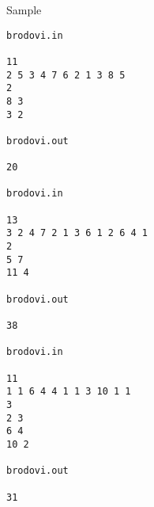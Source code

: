 Sample
\begin{verbatim}
brodovi.in 
 
11 
2 5 3 4 7 6 2 1 3 8 5 
2 
8 3 
3 2 
 
brodovi.out 
 
20 

brodovi.in 
 
13 
3 2 4 7 2 1 3 6 1 2 6 4 1 
2 
5 7 
11 4 
 
brodovi.out 
 
38

brodovi.in 
 
11 
1 1 6 4 4 1 1 3 10 1 1 
3 
2 3 
6 4 
10 2 
 
brodovi.out 
 
31 
\end{verbatim}

 